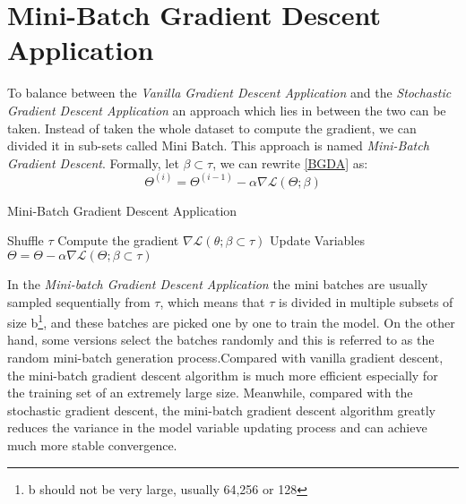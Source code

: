 \documentclass[english]{lni}
\begin{document}
\section{Mini-Batch Gradient Descent Application}
To balance between the \textit{Vanilla Gradient Descent Application} and the  \textit{Stochastic Gradient Descent Application} an approach which lies in between the two can be taken. Instead of taken the whole dataset to compute the gradient, we can divided it in sub-sets called Mini Batch. This approach is named \textit{Mini-Batch Gradient Descent}. 
Formally, let $\beta \subset \tau$, we can rewrite \eqref{BGDA} as:
\begin{equation}
    \Theta^{(i)} = \Theta^{(i-1)} - \alpha\nabla\mathscr{L}(\Theta;\beta )\label{eq:SGDA}
\end{equation}

\begin{algorithm}
\caption{Mini-Batch Gradient Descent Application}\label{SGDA}
\begin{algorithmic}[1]
\State Shuffle $\tau$
\State Compute the gradient $\nabla\mathscr{L}(\theta;\beta \subset \tau)$
\State Update Variables $\Theta = \Theta -\alpha\nabla\mathscr{L}(\Theta;\beta \subset \tau)$
\EndFor
\EndFor
\State{}
\end{algorithmic}
\end{algorithm}
In the \textit{Mini-batch Gradient Descent Application} the mini batches are usually sampled sequentially from $\tau$, which means that $\tau$ is divided in multiple subsets of size b\footnote{b should not be very large, usually 64,256 or 128}, and these batches are picked one by one to train the model. On the other hand, some versions select the batches randomly and this is referred to as the random mini-batch generation process.Compared with vanilla gradient descent, the mini-batch gradient descent algorithm is much more efficient especially for the training set of an extremely large size. Meanwhile, compared with the stochastic gradient descent, the mini-batch gradient descent algorithm greatly reduces the variance in the model variable updating process and can achieve much more stable convergence.\cite{JZ2019}
\end{document}

